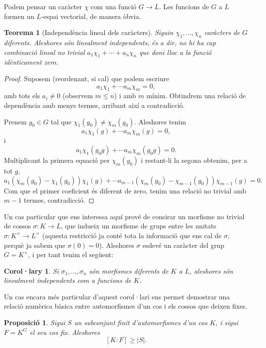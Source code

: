 \documentclass[
]{book}
\newtheorem{theorem}{Teorema}[chapter]
\newtheorem{corollary}{Corol·lary}[chapter]
\newtheorem{proposition}{Proposició}[chapter]
\theoremstyle{definition}
\theoremstyle{definition}
\theoremstyle{definition}
\theoremstyle{definition}
\theoremstyle{remark}
\begin{document}
Podem pensar un caràcter \(\chi\) com una funció \(G\to L\). Les funcions de \(G\) a \(L\) formen un \(L\)-espai vectorial, de manera òbvia.

\begin{theorem}[Independència lineal dels caràcters]
\protect\hypertarget{thm:caracters-li}{}\label{thm:caracters-li}Siguin \(\chi_1,\ldots,\chi_n\) caràcters de \(G\) diferents. Aleshores són linealment independents, és a dir, no hi ha
cap combinació lineal no trivial \(a_1\chi_1+\cdots+a_n\chi_n\) que doni lloc a la funció idènticament zero.
\end{theorem}

\begin{proof}
Suposem (reordenant, si cal) que podem escriure
\[
a_1\chi_1 + \cdots a_m\chi_m = 0,
\]
amb tots els \(a_i\neq 0\) (observem \(m\leq n\)) i amb \(m\) mínim. Obtindrem una relació de dependència amb menys termes, arribant així a contradicció.

Prenem \(g_0\in G\) tal que \(\chi_1(g_0)\neq \chi_m(g_0)\). Aleshores tenim
\[
a_1\chi_1(g) + \cdots a_m\chi_m(g) = 0,
\]
i
\[
a_1\chi_1(g_0g) + \cdots a_m\chi_m(g_0g) = 0.
\]
Multiplicant la primera equació per \(\chi_m(g_0)\) i restant-li la segona obtenim, per a tot \(g\),
\[
a_1(\chi_m(g_0)-\chi_1(g_0)) \chi_1(g) + \cdots a_{m-1}(\chi_m(g_0)- \chi_{m-1}(g_0)) \chi_{m-1}(g) = 0.
\]
Com que el primer coeficient és diferent de zero, tenim una relació no trivial amb \(m-1\) termes, contradicció.
\end{proof}

Un cas particular que ens interessa aquí prové de consirar un morfisme no trivial de cossos \(\sigma\colon K\to L\),
que indueix un morfisme de grups entre les unitats \(\sigma\colon K^\times \to L^\times\) (aquesta restricció ja conté
tota la informació que ens cal de \(\sigma\), perquè ja sabem que \(\sigma(0)=0\)). Aleshores \(\sigma\) esdevé un caràcter
del grup \(G=K^\times\), i per tant tenim el següent:

\begin{corollary}
Si \(\sigma_1,\ldots,\sigma_n\) són morfismes diferents de \(K\) a \(L\), aleshores són linealment independents com a funcions de \(K\).
\end{corollary}

Un cas encara més particular d'aquest corol·lari ens permet demostrar una relació numèrica bàsica entre automorfismes d'un cos
i els cossos que deixen fixes.

\begin{proposition}
Sigui \(S\) un subconjunt finit d'automorfismes d'un cos \(K\), i sigui \(F=K^G\) el seu cos fix. Aleshores
\[
[K\colon F] \geq |S|.
\]
\end{proposition}
\end{document}

